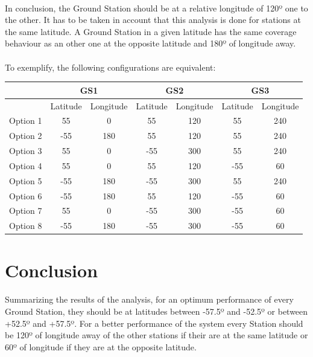 \documentclass[12pt,a4paper]{report}
\begin{document}
\paragraph{}
In conclusion, the Ground Station should be at a relative longitude of 120º one to the other. It has to be taken in account that this analysis is done for stations at the same latitude. A Ground Station in a given latitude has the same coverage behaviour as an other one at the opposite latitude and 180º of longitude away.
\paragraph{}
To exemplify, the following configurations are equivalent:

\begin{center}
\begin{tabular}{|c|c|c|c|c|c|c|}
\hline 
 & \multicolumn{2}{c|}{GS1} & \multicolumn{2}{c|}{GS2} & \multicolumn{2}{c|}{GS3} \\ 
\hline 
 & Latitude & Longitude & Latitude & Longitude & Latitude & Longitude \\ 
\hline 
Option 1 & 55 & 0 & 55 & 120 & 55 & 240 \\ 
\hline 
Option 2 & -55 & 180 & 55 & 120 & 55 & 240 \\ 
\hline 
Option 3 & 55 & 0 & -55 & 300 & 55 & 240 \\ 
\hline 
Option 4 & 55 & 0 & 55 & 120 & -55 & 60 \\ 
\hline 
Option 5 & -55 & 180 & -55 & 300 & 55 & 240 \\ 
\hline 
Option 6 & -55 & 180 & 55 & 120 & -55 & 60 \\ 
\hline 
Option 7 & 55 & 0 & -55 & 300 & -55 & 60 \\ 
\hline 
Option 8 & -55 & 180 & -55 & 300 & -55 & 60 \\ 
\hline 
\end{tabular}
\end{center}

\section{Conclusion}
\paragraph{}
Summarizing the results of the analysis, for an optimum performance of every Ground Station, they should be at latitudes between -57.5º and -52.5º or between +52.5º and +57.5º. For a better performance of the system every Station should be 120º of longitude away of the other stations if their are at the same latitude or 60º of longitude if they are at the opposite latitude.
\end{document}

